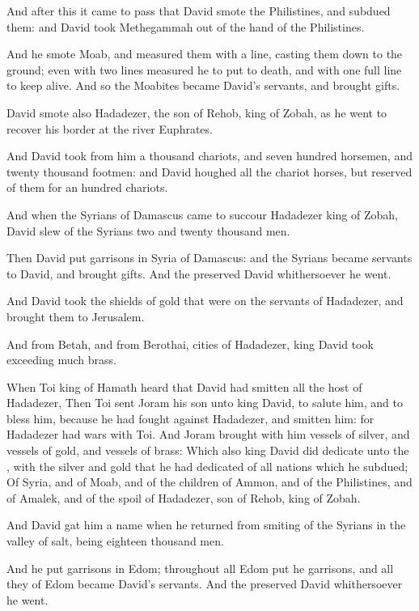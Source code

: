 \Chapter
\Verse And after this it came to pass that David smote the Philistines, and subdued them: and David took Methegammah out of the hand of the Philistines.

\Verse And he smote Moab, and measured them with a line, casting them down to the ground; even with two lines measured he to put to death, and with one full line to keep alive. And so the Moabites became David's servants, and brought gifts.

\Verse David smote also Hadadezer, the son of Rehob, king of Zobah, as he went to recover his border at the river Euphrates.

\Verse And David took from him a thousand chariots, and seven hundred horsemen, and twenty thousand footmen: and David houghed all the chariot horses, but reserved of them for an hundred chariots.

\Verse And when the Syrians of Damascus came to succour Hadadezer king of Zobah, David slew of the Syrians two and twenty thousand men.

\Verse Then David put garrisons in Syria of Damascus: and the Syrians became servants to David, and brought gifts. And the \LORD preserved David whithersoever he went.

\Verse And David took the shields of gold that were on the servants of Hadadezer, and brought them to Jerusalem.

\Verse And from Betah, and from Berothai, cities of Hadadezer, king David took exceeding much brass.

\Verse When Toi king of Hamath heard that David had smitten all the host of Hadadezer, \Verse Then Toi sent Joram his son unto king David, to salute him, and to bless him, because he had fought against Hadadezer, and smitten him: for Hadadezer had wars with Toi. And Joram brought with him vessels of silver, and vessels of gold, and vessels of brass: \Verse Which also king David did dedicate unto the \LORD, with the silver and gold that he had dedicated of all nations which he subdued; \Verse Of Syria, and of Moab, and of the children of Ammon, and of the Philistines, and of Amalek, and of the spoil of Hadadezer, son of Rehob, king of Zobah.

\Verse And David gat him a name when he returned from smiting of the Syrians in the valley of salt, being eighteen thousand men.

\Verse And he put garrisons in Edom; throughout all Edom put he garrisons, and all they of Edom became David's servants. And the \LORD preserved David whithersoever he went.

